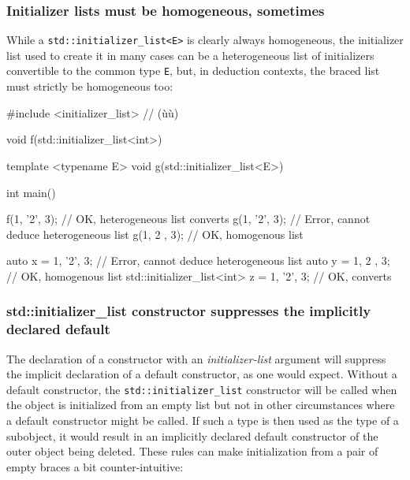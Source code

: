 \subsubsection[Initializer lists must be homogeneous, sometimes]{Initializer lists must be homogeneous, sometimes}\label{initializer-lists-must-be-homogeneous,-sometimes}

While a \lstinline!std::initializer_list<E>! is clearly always
homogeneous, the initializer list used to create it in many cases can be
a heterogeneous list of initializers convertible to the common type
\lstinline!E!, but, in deduction contexts, the braced list must strictly be
homogeneous too:

\begin{emcppslisting}
#include <initializer_list>  // (ù{}ù)

void f(std::initializer_list<int>) {}

template <typename E>
void g(std::initializer_list<E>) {}

int main()
{
    f({1, '2', 3});  // OK, heterogeneous list converts
    g({1, '2', 3});  // Error, cannot deduce heterogeneous list
    g({1,  2 , 3});  // OK, homogenous list

    auto x = {1, '2', 3};  // Error, cannot deduce heterogeneous list
    auto y = {1,  2 , 3};  // OK, homogenous list
    std::initializer_list<int> z = {1, '2', 3};  // OK, converts
}
\end{emcppslisting}
    

\subsubsection[\lstinline!std::initializer_list! constructor suppresses the implicitly declared default]{{\SubsubsecCode std::initializer\_list} constructor suppresses the implicitly declared default}\label{std::initializer_list-constructor-suppresses-the-implicitly-declared-default}

The declaration of a constructor with an \emph{initializer-list}
argument will suppress the implicit declaration of a default
constructor, as one would expect. Without a default constructor, the
\lstinline!std::initializer_list! constructor will be called when the
object is initialized from an empty list but not in other circumstances
where a default constructor might be called. If such a type is then used
as the type of a subobject, it would result in an implicitly declared
default constructor of the outer object being deleted. These rules can
make initialization from a pair of empty braces a bit counter-intuitive:

